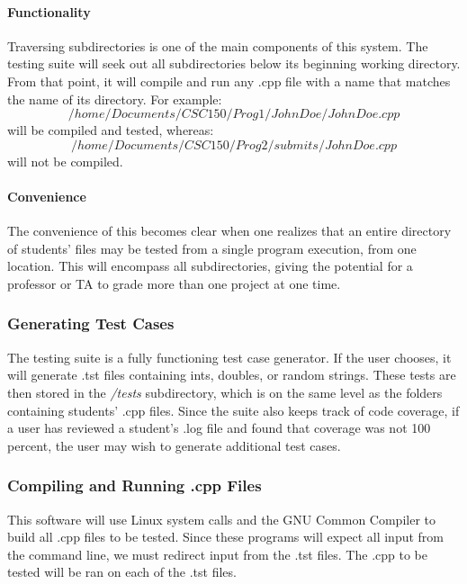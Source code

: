 \documentclass {article}
\begin{document}
		 		\paragraph{Functionality}
		 			Traversing subdirectories is one of the main components of
		 			 this system. The testing suite will seek out all
		 			 subdirectories below its beginning working directory. From
		 			 that point, it will compile and run any .cpp file with a
		 			 name that matches the name of its directory. For example:
		 			 \begin{equation*}
		 			 	/home/Documents/CSC150/Prog1/JohnDoe/JohnDoe.cpp
		 			 \end{equation*}
		 			 will be compiled and tested, whereas:
		 			 \begin{equation*}
		 			 	/home/Documents/CSC150/Prog2/submits/JohnDoe.cpp
		 			 \end{equation*}
		 			 will not be compiled.
		 		 
		 		 \paragraph{Convenience}
		 		 	The convenience of this becomes clear when one realizes that
		 		 	 an entire directory of students' files may be tested from a
		 		 	 single program execution, from one location. This will
		 		 	 encompass all subdirectories, giving the potential for a
		 		 	 professor or TA to grade more than one project at one time.
		 		 
			\subsubsection{\large{\color{cyan}Generating Test Cases}}
				The testing suite is a fully functioning test case generator.
				 If the user chooses, it will generate .tst files containing
				 ints, doubles, or random strings. These tests are then
				 stored in the \textit{/tests} subdirectory, which is on the
				 same level as the folders containing students' .cpp files.
				 Since the suite also keeps track of code coverage, if a user
				 has reviewed a student's .log file and found that coverage
				 was not 100 percent, the user may wish to generate
				 additional test cases.		 		 
		 		 
		 	\subsubsection{\large{\color{cyan}Compiling and Running .cpp Files}}
		 		This software will use Linux system calls and the GNU
		 		 Common Compiler to build all .cpp files to be tested.
		 		 Since these programs will expect all input from the
		 		 command line, we must redirect input from the .tst files.
		 		 The .cpp to be tested will be ran on each of the .tst
		 		 files.
		 		 
\end{document}
